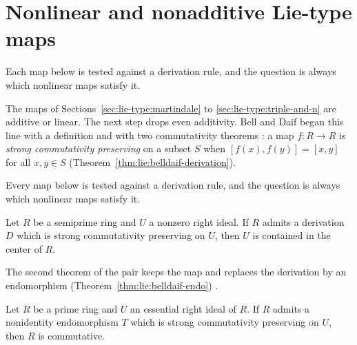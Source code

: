 \section{Nonlinear and nonadditive Lie-type maps}\label{sec:lie-type:nonlinear}

Each map below is tested against a derivation rule, and the question is always
which nonlinear maps satisfy it.

The maps of Sections~\ref{sec:lie-type:martindale} to
\ref{sec:lie-type:triple-and-n} are additive or linear. The next step drops
even additivity.
Bell and
Daif began this line with a definition and with two commutativity theorems
\cite[p.~443]{BellDaif1994}: a map $f\colon R\to R$ is \emph{strong
commutativity preserving} on a subset $S$ when $[f(x),f(y)]=[x,y]$ for all
$x,y\in S$ (Theorem~\ref{thm:lie:belldaif-derivation}).

Every map below is tested against a derivation rule, and the question is
always which nonlinear maps satisfy it.

\begin{theorem}\label{thm:lie:belldaif-derivation}
Let $R$ be a semiprime ring and $U$ a nonzero right ideal. If $R$ admits a
derivation $D$ which is strong commutativity preserving on $U$, then $U$ is
contained in the center of $R$.
\end{theorem}

The second theorem of the pair keeps the map and replaces the derivation by an
endomorphism (Theorem~\ref{thm:lie:belldaif-endo})
\cite[p.~446]{BellDaif1994}.

\begin{theorem}\label{thm:lie:belldaif-endo}
Let $R$ be a prime ring and $U$ an essential right ideal of $R$. If $R$
admits a nonidentity endomorphism $T$ which is strong commutativity
preserving on $U$, then $R$ is commutative.
\end{theorem}

